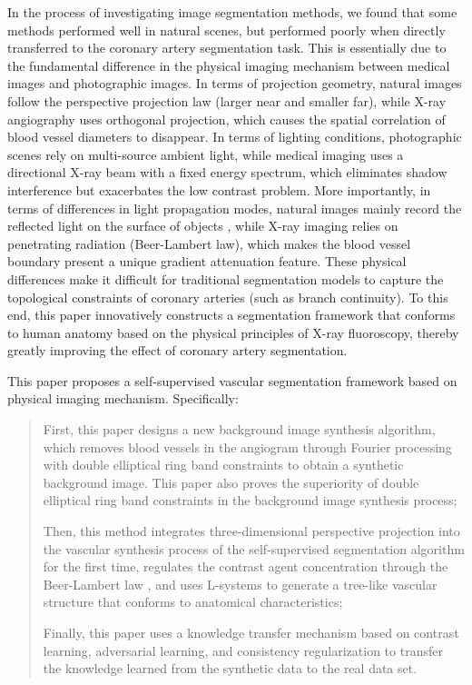 
In the process of investigating image segmentation methods, we found that some methods \cite{FC.19.IIC}\cite{FC.9.ReDO} performed well in natural scenes, but performed poorly when directly transferred to the coronary artery segmentation task. This is essentially due to the fundamental difference in the physical imaging mechanism between medical images and photographic images. In terms of projection geometry, natural images follow the perspective projection law (larger near and smaller far), while X-ray angiography uses orthogonal projection, which causes the spatial correlation of blood vessel diameters to disappear. In terms of lighting conditions, photographic scenes rely on multi-source ambient light, while medical imaging uses a directional X-ray beam with a fixed energy spectrum, which eliminates shadow interference but exacerbates the low contrast problem. More importantly, in terms of differences in light propagation modes, natural images mainly record the reflected light on the surface of objects \cite{web3d}\cite{web3d.2}, while X-ray imaging relies on penetrating radiation (Beer-Lambert law), which makes the blood vessel boundary present a unique gradient attenuation feature. These physical differences make it difficult for traditional segmentation models to capture the topological constraints of coronary arteries (such as branch continuity). To this end, this paper innovatively constructs a segmentation framework that conforms to human anatomy based on the physical principles of X-ray fluoroscopy, thereby greatly improving the effect of coronary artery segmentation.


This paper proposes a self-supervised vascular segmentation framework based on physical imaging mechanism. Specifically: 
\begin{quotation}
  \noindent
First, this paper designs a new background image synthesis algorithm, which removes blood vessels in the angiogram through Fourier processing with double elliptical ring band constraints to obtain a synthetic background image. This paper also proves the superiority of double elliptical ring band constraints in the background image synthesis process; 

Then, this method integrates three-dimensional perspective projection into the vascular synthesis process of the self-supervised segmentation algorithm for the first time, regulates the contrast agent concentration through the Beer-Lambert law \cite{Beer-Lambert}, and uses L-systems \cite{02.02.L-systems} to generate a tree-like vascular structure that conforms to anatomical characteristics; 

Finally, this paper uses a knowledge transfer mechanism based on contrast learning, adversarial learning, and consistency regularization to transfer the knowledge learned from the synthetic data to the real data set. 
\end{quotation}

